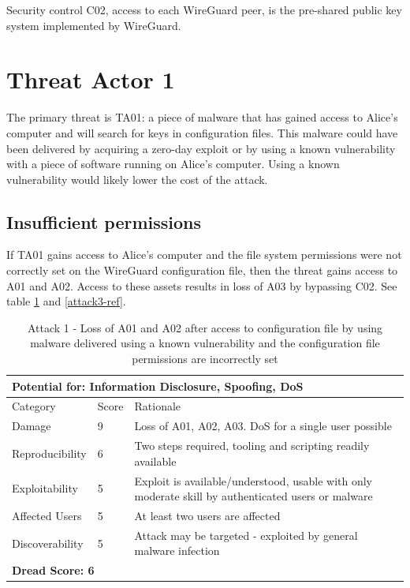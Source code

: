 \documentclass [11pt, proquest] {uwthesis}[2020/02/24]
\begin{document}
Security control C02, access to each WireGuard peer, is the pre-shared public key system implemented by WireGuard.

\section{Threat Actor 1}
The primary threat is TA01: a piece of malware that has gained access to Alice's computer and will search for keys in configuration files. This malware could have been delivered by acquiring a zero-day exploit or by using a known vulnerability with a piece of software running on Alice's computer. Using a known vulnerability would likely lower the cost of the attack.

\subsection{Insufficient permissions}
If TA01 gains access to Alice's computer and the file system permissions were not correctly set on the WireGuard configuration file, then the threat gains access to A01 and A02. Access to these assets results in loss of A03 by bypassing C02. 
See table \ref{attack1-ref} and \ref{attack3-ref}.
\begin{table}[H]
\label{attack1-ref}
\begin{tabular}{|m{3cm}|m{.9cm}|p{27em} |}
\multicolumn{3}{l}{Potential for: Information Disclosure, Spoofing, DoS}                   \\
\hline
Category & Score & Rationale                                                    \\
\hline
Damage          & 9     & Loss of A01, A02, A03. DoS for a single user possible            \\
\hline
Reproducibility & 6     & Two steps required, tooling and scripting readily available    \\
\hline
Exploitability & 5      & Exploit is available/understood, usable with only moderate skill by authenticated users or malware \\
\hline
Affected Users  & 5     & At least two users are affected                     \\
\hline
Discoverability & 5     & Attack may be targeted - exploited by general malware infection \\
\hline
\multicolumn{3}{l}{\textbf{Dread Score: 6}} 
\end{tabular}
\caption{Attack 1 - Loss of A01 and A02 after access to configuration file by using malware delivered using a known vulnerability and the configuration file permissions are incorrectly set}
\end{table}
\end{document}
